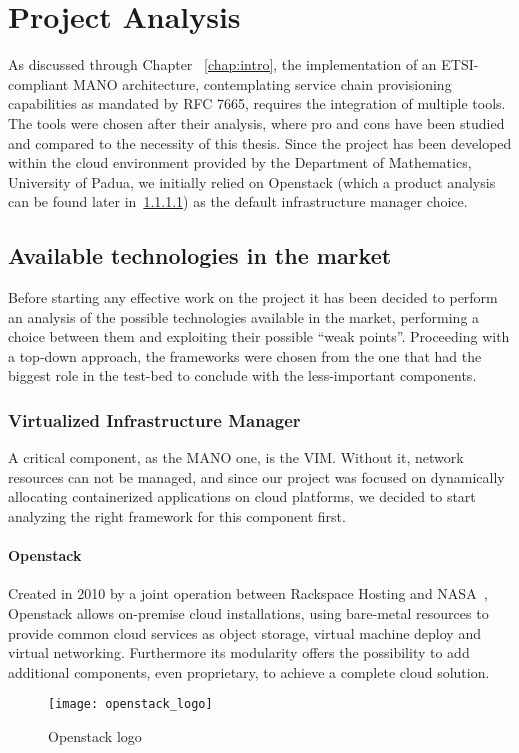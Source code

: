 \chapter{Project Analysis}
\label{chap:prjan}

As discussed through Chapter ~\ref{chap:intro}, the implementation of an
ETSI-compliant MANO architecture, contemplating service chain provisioning
capabilities as mandated by RFC 7665, requires the integration of multiple
tools. The tools were chosen after their analysis, where pro and cons have been
studied and compared to the necessity of this thesis. Since the project has been
developed within the cloud environment provided by the Department of
Mathematics, University of Padua, we initially relied on Openstack (which a
product analysis can be found later in~\ref{chap:prjan:sec:openstack}) as the
default infrastructure manager choice.

\section{Available technologies in the market}
\label{chap:prjan:sec:tech}
Before starting any effective work on the project it has been decided to 
perform an analysis of the possible technologies available in the market, 
performing a choice between them and exploiting their possible ``weak 
points''. Proceeding with a top-down approach, the frameworks were chosen from 
the one that had the biggest role in the test-bed to conclude with the 
less-important components.

\subsection{Virtualized Infrastructure Manager}
A critical component, as the MANO one, is the VIM. Without it, network resources
can not be managed, and since our project was focused on dynamically allocating
containerized applications on cloud platforms, we decided to start analyzing the
right framework for this component first.

\subsubsection{Openstack}
\label{chap:prjan:sec:openstack}
Created in 2010 by a joint operation between Rackspace Hosting and
NASA~\cite{openstackWebsite}, Openstack allows on-premise cloud installations,
using bare-metal resources to provide common cloud services as object storage,
virtual machine deploy and virtual networking. Furthermore its modularity offers
the possibility to add additional components, even proprietary, to achieve a
complete cloud solution.
\begin{figure}[h]
 \centering \texttt{[image: openstack\_logo]}
 \caption{Openstack logo}
 \label{chap:prjan:img:openstack_logo}
\end{figure}

